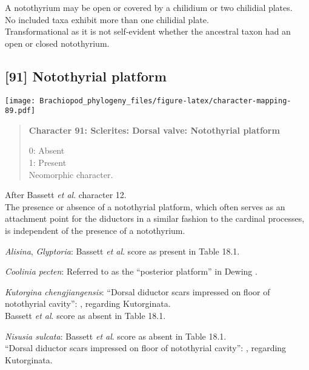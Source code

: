 \documentclass[openany]{book}
\theoremstyle{definition}
\theoremstyle{definition}
\theoremstyle{definition}
\theoremstyle{remark}
\begin{document}
A notothyrium may be open or covered by a chilidium or two chilidial
plates.\\
No included taxa exhibit more than one chilidial plate.\\
Transformational as it is not self-evident whether the ancestral taxon
had an open or closed notothyrium.

\subsection*{{[}91{]} Notothyrial platform}\label{notothyrial-platform}

\texttt{[image: Brachiopod\_phylogeny\_files/figure-latex/character-mapping-89.pdf]}

\begin{quote}
\textbf{Character 91: Sclerites: Dorsal valve: Notothyrial platform}

0: Absent\\
1: Present\\
Neomorphic character.
\end{quote}

After Bassett \emph{et al}.
\citeyearpar{Bassett2001Functionalmorphology} character 12.\\
The presence or absence of a notothyrial platform, which often serves as
an attachment point for the diductors in a similar fashion to the
cardinal processes, is independent of the presence of a notothyrium.

\hypertarget{Alisina-coding-91}{}
\emph{Alisina}, \emph{Glyptoria}: Bassett \emph{et al}.
\citeyearpar{Bassett2001Functionalmorphology} score as present in Table
18.1.

\hypertarget{Coolinia_pecten-coding-91}{}
\emph{Coolinia pecten}: Referred to as the ``posterior platform'' in
Dewing \citeyearpar{Dewing2001Hingemodifications}.

\hypertarget{Kutorgina_chengjiangensis-coding-91}{}
\emph{Kutorgina chengjiangensis}: ``Dorsal diductor scars impressed on
floor of notothyrial cavity'':
\citet{Williams2000LinguliformeaCraniiformea}, regarding Kutorginata.\\
Bassett \emph{et al}. \citeyearpar{Bassett2001Functionalmorphology}
score as absent in Table 18.1.

\hypertarget{Nisusia_sulcata-coding-91}{}
\emph{Nisusia sulcata}: Bassett \emph{et al}.
\citeyearpar{Bassett2001Functionalmorphology} score as absent in Table
18.1.\\
``Dorsal diductor scars impressed on floor of notothyrial cavity'':
\citet{Williams2000LinguliformeaCraniiformea}, regarding Kutorginata.
\end{document}
